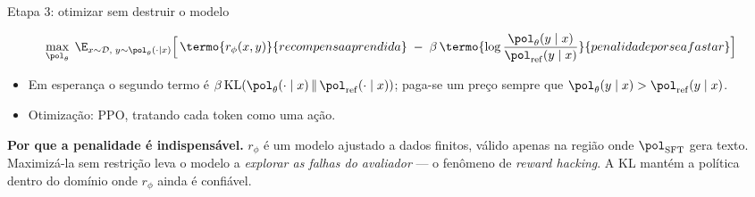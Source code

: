 \documentclass[aspectratio=169, 11pt]{beamer}
\newcommand{\thv}{\theta}
\newcommand{\polth}{\pol_{\thv}}                 %
\newcommand{\pref}{\pol_{\mathrm{ref}}}          %
\newcommand{\psft}{\pol_{\mathrm{SFT}}}          %
\newcommand{\rphi}{r_{\phi}}                     %
\newcommand{\Dset}{\mathcal{D}}
\newcommand{\KLd}[2]{\mathrm{KL}\!\left(#1 \,\middle\|\, #2\right)}
\begin{document}
\begin{frame}{Etapa 3: otimizar sem destruir o modelo}

  \[
    \max_{\polth}\;
      \E_{x\sim\Dset,\; y\sim\polth(\cdot\mid x)}
      \Bigl[\, \termo{\rphi(x,y)}{recompensa aprendida}
        \;-\; \beta\, \termo{\log \frac{\polth(y\mid x)}{\pref(y\mid x)}}{
          penalidade por se afastar} \Bigr]
  \]

  \begin{itemize}\setlength{\itemsep}{0.3ex}
    \item Em esperança o segundo termo é
      $\beta\,\KLd{\polth(\cdot\mid x)}{\pref(\cdot\mid x)}$; paga-se um preço
      sempre que $\polth(y\mid x) > \pref(y\mid x)$.
    \item Otimização: PPO, tratando cada token como uma ação.
  \end{itemize}

  \begin{alertabox}
    \textbf{Por que a penalidade é indispensável.} $\rphi$ é um modelo ajustado a
    dados finitos, válido apenas na região onde $\psft$ gera texto. Maximizá-la
    sem restrição leva o modelo a \emph{explorar as falhas do avaliador} ---
    o fenômeno de \emph{reward hacking}. A KL mantém a política dentro do
    domínio onde $\rphi$ ainda é confiável.
  \end{alertabox}
\end{frame}
\end{document}
